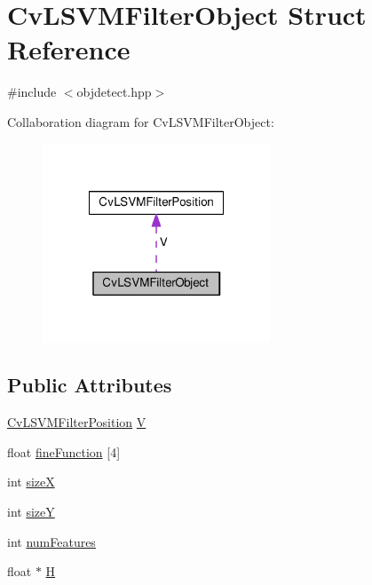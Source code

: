 \hypertarget{structCvLSVMFilterObject}{\section{Cv\-L\-S\-V\-M\-Filter\-Object Struct Reference}
\label{structCvLSVMFilterObject}
}


{\ttfamily \#include $<$objdetect.\-hpp$>$}



Collaboration diagram for Cv\-L\-S\-V\-M\-Filter\-Object\-:\nopagebreak
\begin{figure}[H]
\begin{center}
\leavevmode
\includegraphics[width=192pt]{structCvLSVMFilterObject__coll__graph}
\end{center}
\end{figure}
\subsection*{Public Attributes}
\begin{DoxyCompactItemize}
\item 
\hyperlink{structCvLSVMFilterPosition}{Cv\-L\-S\-V\-M\-Filter\-Position} \hyperlink{structCvLSVMFilterObject_aa863bb7dd44594c6c5e9958c2889a0d0}{V}
\item 
float \hyperlink{structCvLSVMFilterObject_aab9fae44a9f501cdbbfa52e9202d2949}{fine\-Function} \mbox{[}4\mbox{]}
\item 
int \hyperlink{structCvLSVMFilterObject_aa84db5d1e38b01273e6d1205f3814cf4}{size\-X}
\item 
int \hyperlink{structCvLSVMFilterObject_a3f1d02f198f7db26b47cc89b5ff9140c}{size\-Y}
\item 
int \hyperlink{structCvLSVMFilterObject_a6d60233254530bb988abcd0960610fac}{num\-Features}
\item 
float $\ast$ \hyperlink{structCvLSVMFilterObject_ae03bc2e037b90613d4e4daca74ebeb98}{H}
\end{DoxyCompactItemize}


